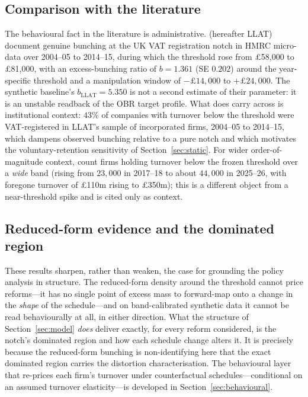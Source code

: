 \subsection{Comparison with the literature}
\label{ssec:bunch-lit}

The behavioural fact in the literature is administrative. \citet{liuetal2021}
(hereafter LLAT) document genuine bunching at the UK VAT registration notch in
HMRC micro-data over 2004--05 to 2014--15, during which the threshold rose
from \pounds58{,}000 to \pounds81{,}000, with an excess-bunching ratio of
$b = 1.361$ (SE $0.202$) around the year-specific threshold and a manipulation
window of $-\pounds14{,}000$ to $+\pounds24{,}000$. The synthetic baseline's
$b_{\mathrm{LLAT}}=5.350$ is not a second estimate of their parameter: it is
an unstable readback of the OBR target profile. What does
carry across is institutional context: $43\%$ of companies with turnover below
the threshold were VAT-registered in LLAT's sample of incorporated firms,
2004--05 to 2014--15, which dampens
observed bunching relative to a pure notch and which motivates the
voluntary-retention sensitivity of Section~\ref{sec:static}. For wider
order-of-magnitude context, \citet{obr2023vat} count firms holding turnover
below the frozen threshold over a \emph{wide} band (rising from $23{,}000$ in
2017--18 to about $44{,}000$ in 2025--26, with foregone turnover of
\pounds110m rising to \pounds350m); this is a different object from a
near-threshold spike and is cited only as context.

\subsection{Reduced-form evidence and the dominated region}

These results sharpen, rather than weaken, the case for grounding the policy
analysis in structure. The reduced-form density around the threshold cannot
price reforms---it has no single point of excess mass to forward-map onto a
change in the \emph{shape} of the schedule---and on band-calibrated synthetic
data it cannot be read behaviourally at all, in either direction. What the
structure of Section~\ref{sec:model} \emph{does} deliver exactly, for every
reform considered, is the notch's dominated region and how each schedule
change alters it. It is precisely because the reduced-form bunching is
non-identifying here that the exact dominated region carries the distortion
characterisation. The behavioural layer that re-prices each firm's turnover
under counterfactual schedules---conditional on an assumed turnover
elasticity---is developed in Section~\ref{sec:behavioural}.
